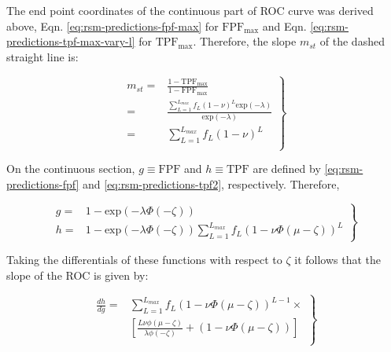 \documentclass[
]{book}
\begin{document}
The end point coordinates of the continuous part of ROC curve was derived above, Eqn. \eqref{eq:rsm-predictions-fpf-max} for \(\text{FPF}_{\text{max}}\) and Eqn. \eqref{eq:rsm-predictions-tpf-max-vary-l} for \(\text{TPF}_{\text{max}}\). Therefore, the slope \(m_{st}\) of the dashed straight line is:

\begin{equation}
\left. 
\begin{aligned}
m_{st} =& \frac{1-\text{TPF}_{\text{max}}}{1-\text{FPF}_{\text{max}}}\\
=&\frac{\sum_{L=1}^{L_{max}} f_L \left ( 1 - \nu \right )^L
 \text{exp} \left ( - \lambda \right )} {\text{exp} \left ( - \lambda \right )} \\
=& \sum_{L=1}^{L_{max}} f_L \left ( 1 - \nu \right )^L  \\
\end{aligned}
\right \}
\label{eq:rsm-slope-st-line}
\end{equation}

On the continuous section, \(g\equiv\text{FPF}\) and \(h\equiv\text{TPF}\) are defined by \eqref{eq:rsm-predictions-fpf} and \eqref{eq:rsm-predictions-tpf2}, respectively. Therefore,

\begin{equation}
\left. 
\begin{aligned}
g =& 1-\text{exp} \left ( -\lambda \Phi\left ( -\zeta \right ) \right ) \\
h =& 1-\text{exp} \left ( -\lambda \Phi\left ( -\zeta \right ) \right ) \sum_{L=1}^{L_{max}}f_L \left ( 1-\nu\Phi\left ( \mu - \zeta \right ) \right )^{L}
\end{aligned}
\right \}
\label{eq:rsm-predictions-slope-eq3}
\end{equation}

Taking the differentials of these functions with respect to \(\zeta\) it follows that the slope of the ROC is given by:

\begin{equation}
\left. 
\begin{aligned}
\frac{dh}{dg} =& \sum_{L=1}^{L_{max}}  f_L \left ( 1-\nu\Phi\left ( \mu-\zeta \right ) \right )^{L-1}  \times \\
& \left [ \frac{L\nu\phi\left ( \mu-\zeta \right )}{\lambda\phi\left ( -\zeta \right )} + \left ( 1-\nu\Phi \left ( \mu-\zeta \right )\right ) \right ]\\ 
\end{aligned}
\right \} 
\label{eq:rsm-predictions-slope-eq4}
\end{equation}
\end{document}
